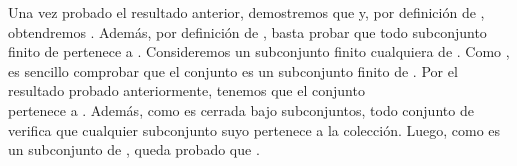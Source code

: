 \begin{isabellebody}
\begin{isamarkuptext}
\begin{demostracion}
  Una vez probado el resultado anterior, demostremos que  y, por definición de 
  , obtendremos . Además, por definición de , basta probar que todo 
  subconjunto finito de  pertenece a . Consideremos  un subconjunto finito 
  cualquiera de . Como , es sencillo comprobar que el conjunto 
   es un subconjunto finito de . Por el resultado probado anteriormente, 
  tenemos que el conjunto  \\  pertenece a . 
  Además, como  es cerrada bajo subconjuntos, todo conjunto de  verifica que cualquier 
  subconjunto suyo pertenece a la colección. Luego, como  es un subconjunto de 
  , queda probado que .


\end{demostracion}
\end{isamarkuptext}
\end{isabellebody}
